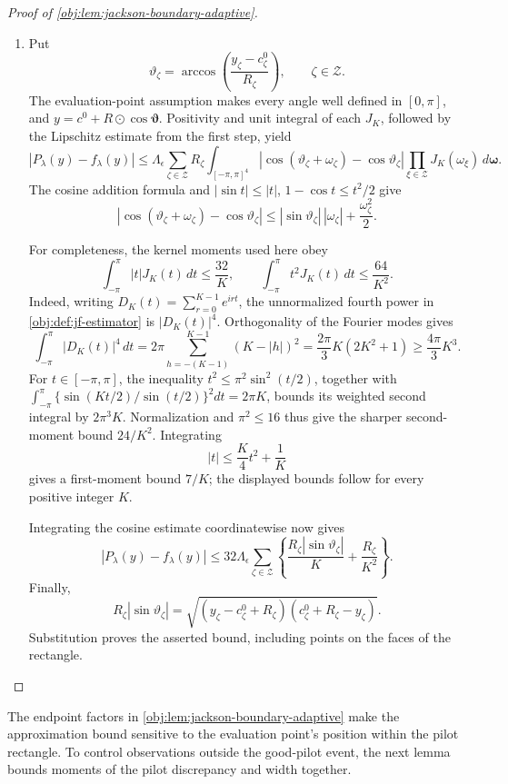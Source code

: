 \documentclass[11pt]{article}
\begin{document}
\begin{proof}[Proof of \cref{obj:lem:jackson-boundary-adaptive}]
\begin{enumerate}
\item Put
\[
\vartheta_\zeta
=
\arccos\!\left(\frac{y_\zeta-c^0_\zeta}{R_\zeta}\right),
\qquad \zeta\in\mathcal Z.
\]
The evaluation-point assumption makes every angle well defined in \([0,\pi]\), and \(y=c^0+R\odot\cos\boldsymbol\vartheta\). Positivity and unit integral of each \(J_K\), followed by the Lipschitz estimate from the first step, yield
\[
|P_\lambda(y)-f_\lambda(y)|
\leq
\Lambda_\epsilon\sum_{\zeta\in\mathcal Z}R_\zeta
\int_{[-\pi,\pi]^4}
\left|\cos(\vartheta_\zeta+\omega_\zeta)
-\cos\vartheta_\zeta\right|
\prod_{\xi\in\mathcal Z}J_K(\omega_\xi)
\,d\boldsymbol\omega.
\]
The cosine addition formula and
\(|\sin t|\leq|t|\), \(1-\cos t\leq t^2/2\) give
\[
|\cos(\vartheta_\zeta+\omega_\zeta)-\cos\vartheta_\zeta|
\leq|\sin\vartheta_\zeta|\,|\omega_\zeta|
+\frac{\omega_\zeta^2}{2}.
\]

For completeness, the kernel moments used here obey
\[
\int_{-\pi}^{\pi}|t|J_K(t)\,dt\leq\frac{32}{K},
\qquad
\int_{-\pi}^{\pi}t^2J_K(t)\,dt\leq\frac{64}{K^2}.
\]
Indeed, writing \(D_K(t)=\sum_{r=0}^{K-1}e^{irt}\), the unnormalized fourth power in \cref{obj:def:jf-estimator} is \(|D_K(t)|^4\). Orthogonality of the Fourier modes gives
\[
\int_{-\pi}^{\pi}|D_K(t)|^4\,dt
=2\pi\sum_{h=-(K-1)}^{K-1}(K-|h|)^2
=\frac{2\pi}{3}K(2K^2+1)
\geq\frac{4\pi}{3}K^3.
\]
For \(t\in[-\pi,\pi]\), the inequality
\(t^2\leq\pi^2\sin^2(t/2)\), together with
\(\int_{-\pi}^{\pi}\{\sin(Kt/2)/\sin(t/2)\}^2dt=2\pi K\),
bounds its weighted second integral by \(2\pi^3K\).
Normalization and \(\pi^2\leq16\) thus give the sharper second-moment bound \(24/K^2\). Integrating
\[
|t|\leq\frac K4t^2+\frac1K
\]
gives a first-moment bound \(7/K\); the displayed bounds follow for every positive integer \(K\).

Integrating the cosine estimate coordinatewise now gives
\[
|P_\lambda(y)-f_\lambda(y)|
\leq
32\Lambda_\epsilon
\sum_{\zeta\in\mathcal Z}
\left\{
\frac{R_\zeta|\sin\vartheta_\zeta|}{K}
+\frac{R_\zeta}{K^2}
\right\}.
\]
Finally,
\[
R_\zeta|\sin\vartheta_\zeta|
=
\sqrt{(y_\zeta-c^0_\zeta+R_\zeta)
(c^0_\zeta+R_\zeta-y_\zeta)}.
\]
Substitution proves the asserted bound, including points on the faces of the rectangle. %
\end{enumerate}
\end{proof}

The endpoint factors in \cref{obj:lem:jackson-boundary-adaptive} make the approximation bound sensitive to the evaluation point’s position within the pilot rectangle. To control observations outside the good-pilot event, the next lemma bounds moments of the pilot discrepancy and width together.
\end{document}
